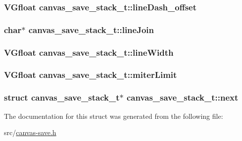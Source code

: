 \subsubsection[{line\+Dash\+\_\+offset}]{\setlength{\rightskip}{0pt plus 5cm}V\+Gfloat canvas\+\_\+save\+\_\+stack\+\_\+t\+::line\+Dash\+\_\+offset}\label{structcanvas__save__stack__t_a2a77bb2fd9162791d2913b8ebaaaf75b}
\hypertarget{structcanvas__save__stack__t_a47a68a239d0bfdf125dea13a89030409}{}
\subsubsection[{line\+Join}]{\setlength{\rightskip}{0pt plus 5cm}char$\ast$ canvas\+\_\+save\+\_\+stack\+\_\+t\+::line\+Join}\label{structcanvas__save__stack__t_a47a68a239d0bfdf125dea13a89030409}
\hypertarget{structcanvas__save__stack__t_ae76623d478ccfaec28e3166c755ec174}{}
\subsubsection[{line\+Width}]{\setlength{\rightskip}{0pt plus 5cm}V\+Gfloat canvas\+\_\+save\+\_\+stack\+\_\+t\+::line\+Width}\label{structcanvas__save__stack__t_ae76623d478ccfaec28e3166c755ec174}
\hypertarget{structcanvas__save__stack__t_ad1ac8b9082b1b9f77e91ffd73278cd5a}{}
\subsubsection[{miter\+Limit}]{\setlength{\rightskip}{0pt plus 5cm}V\+Gfloat canvas\+\_\+save\+\_\+stack\+\_\+t\+::miter\+Limit}\label{structcanvas__save__stack__t_ad1ac8b9082b1b9f77e91ffd73278cd5a}
\hypertarget{structcanvas__save__stack__t_a214b86daeaa6f4461d169921a9c0298d}{}
\subsubsection[{next}]{\setlength{\rightskip}{0pt plus 5cm}struct {\bf canvas\+\_\+save\+\_\+stack\+\_\+t}$\ast$ canvas\+\_\+save\+\_\+stack\+\_\+t\+::next}\label{structcanvas__save__stack__t_a214b86daeaa6f4461d169921a9c0298d}


The documentation for this struct was generated from the following file\+:\begin{DoxyCompactItemize}
\item 
src/\hyperlink{canvas-save_8h}{canvas-\/save.\+h}\end{DoxyCompactItemize}
